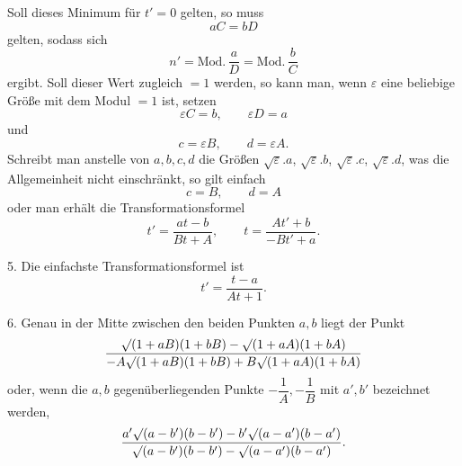 \noindent Soll dieses Minimum für $t'=0$ gelten, so muss
\[
aC=bD
\]
gelten, sodass sich
\[
n'=\text{Mod.}\,\frac{a}{D}=\text{Mod.}\,\frac{b}{C}
\]
ergibt. Soll dieser Wert zugleich $=1$ werden, so kann man, wenn $\varepsilon$ eine beliebige
Größe mit dem Modul $=1$ ist, setzen
\[
\varepsilon{}C=b,\qquad \varepsilon{}D=a
\]
und
\[
c=\varepsilon{}B,\qquad d=\varepsilon{}A.
\]
Schreibt man anstelle von $a,b,c,d$ die Größen $\sqrt{\varepsilon}.a$,
$\sqrt{\varepsilon}.b$, $\sqrt{\varepsilon}.c$, $\sqrt{\varepsilon}.d$,
was die Allgemeinheit nicht einschränkt, so gilt einfach
\[
c=B,\qquad d=A
\]
oder man erhält die Transformationsformel
\[
t'=\frac{at-b}{Bt+A},\qquad
t=\frac{At'+b}{-Bt'+a}.
\]

5. Die einfachste Transformationsformel ist
\[
t'=\frac{t-a}{At+1}.
\]

6. Genau in der Mitte zwischen den beiden Punkten $a,b$ liegt der Punkt
\[
\frac{\mathord{\surd}(1+aB)(1+bB)-\mathord{\surd}(1+aA)(1+bA)}
{-A\mathord{\surd}(1+aB)(1+bB)+B\mathord{\surd}(1+aA)(1+bA)}
\]
oder, wenn die $a,b$ gegenüberliegenden Punkte $-\dfrac{1}{A},-\dfrac{1}{B}$
mit $a',b'$ bezeichnet werden,
\[
\frac{a'\mathord{\surd}(a-b')(b-b')-b'\mathord{\surd}(a-a')(b-a')}
{\mathord{\surd}(a-b')(b-b')-\mathord{\surd}(a-a')(b-a')}.
\]
